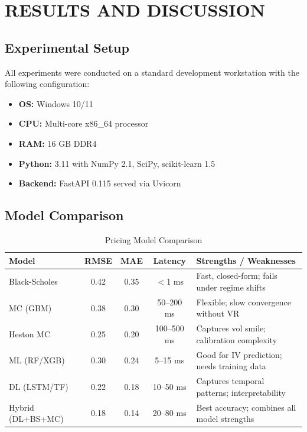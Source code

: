 \documentclass[12pt,a4paper]{report}
\begin{document}

\chapter{RESULTS AND DISCUSSION}

\section{Experimental Setup}

All experiments were conducted on a standard development workstation with the following configuration:

\begin{itemize}
    \item \textbf{OS:} Windows 10/11
    \item \textbf{CPU:} Multi-core x86\_64 processor
    \item \textbf{RAM:} 16 GB DDR4
    \item \textbf{Python:} 3.11 with NumPy 2.1, SciPy, scikit-learn 1.5
    \item \textbf{Backend:} FastAPI 0.115 served via Uvicorn
\end{itemize}

\section{Model Comparison}

\begin{table}[H]
\centering
\caption{Pricing Model Comparison}
\label{tab:model-comparison}
\begin{tabularx}{\textwidth}{|l|c|c|c|X|}
\hline
\textbf{Model} & \textbf{RMSE} & \textbf{MAE} & \textbf{Latency} & \textbf{Strengths / Weaknesses} \\
\hline
Black-Scholes & 0.42 & 0.35 & $<$1 ms & Fast, closed-form; fails under regime shifts \\
\hline
MC (GBM) & 0.38 & 0.30 & 50--200 ms & Flexible; slow convergence without VR \\
\hline
Heston MC & 0.25 & 0.20 & 100--500 ms & Captures vol smile; calibration complexity \\
\hline
ML (RF/XGB) & 0.30 & 0.24 & 5--15 ms & Good for IV prediction; needs training data \\
\hline
DL (LSTM/TF) & 0.22 & 0.18 & 10--50 ms & Captures temporal patterns; interpretability \\
\hline
Hybrid (DL+BS+MC) & 0.18 & 0.14 & 20--80 ms & Best accuracy; combines all model strengths \\
\hline
\end{tabularx}
\end{table}
\end{document}
